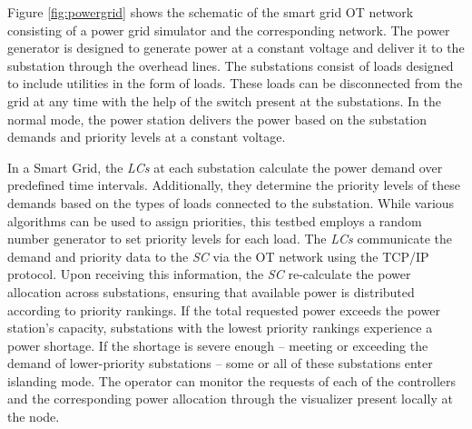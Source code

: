 Figure \ref{fig:powergrid} shows the schematic of the smart grid OT network consisting of a power grid simulator and the corresponding network.
The power generator is designed to generate power at a constant voltage and deliver it to the substation through the overhead lines. The substations consist of loads designed to include utilities in the form of loads. These loads can be disconnected from the grid at any time with the help of the switch present at the substations. In the normal mode, the power station delivers the power based on the substation demands and priority levels at a constant voltage. 

In a Smart Grid, the \textit{LCs} at each substation calculate the power demand over predefined time intervals. Additionally, they determine the priority levels of these demands based on the types of loads connected to the substation. While various algorithms can be used to assign priorities, this testbed employs a random number generator to set priority levels for each load. The \textit{LCs} communicate the demand and priority data to the \textit{SC} via the OT network using the TCP/IP protocol. Upon receiving this information, the \textit{SC} re-calculate the power allocation across substations, ensuring that available power is distributed according to priority rankings. If the total requested power exceeds the power station’s capacity, substations with the lowest priority rankings experience a power shortage. If the shortage is severe enough -- meeting or exceeding the demand of lower-priority substations -- some or all of these substations enter islanding mode. 
The operator can monitor the requests of each of the controllers and the corresponding power allocation through the visualizer present locally at the node. 



